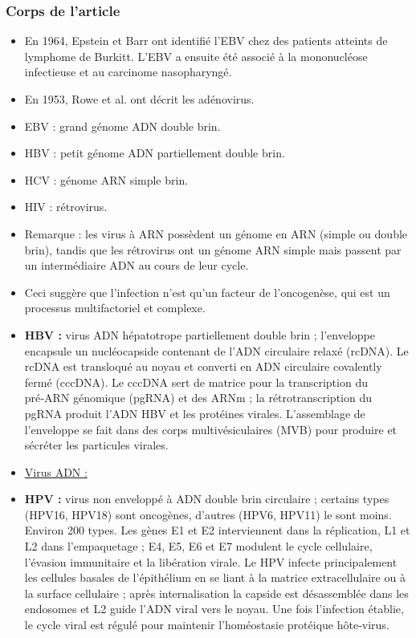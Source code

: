 \documentclass{article}
\begin{document}
\subsubsection{Corps de l'article}
\begin{itemize}
    \item En 1964, Epstein et Barr ont identifié l'EBV chez des patients atteints de lymphome de Burkitt. L'EBV a ensuite été associé à la mononucléose infectieuse et au carcinome nasopharyngé.
    \item En 1953, Rowe et al. ont décrit les adénovirus.
    \item EBV : grand génome ADN double brin.
    \item HBV : petit génome ADN partiellement double brin.
    \item HCV : génome ARN simple brin.
    \item HIV : rétrovirus.
    \item Remarque : les virus à ARN possèdent un génome en ARN (simple ou double brin), tandis que les rétrovirus ont un génome ARN simple mais passent par un intermédiaire ADN au cours de leur cycle.
    \item Ceci suggère que l'infection n'est qu'un facteur de l'oncogenèse, qui est un processus multifactoriel et complexe.
    \item \textbf{HBV :} virus ADN hépatotrope partiellement double brin ; l'enveloppe encapsule un nucléocapside contenant de l'ADN circulaire relaxé (rcDNA). Le rcDNA est transloqué au noyau et converti en ADN circulaire covalently fermé (cccDNA). Le cccDNA sert de matrice pour la transcription du pré‑ARN génomique (pgRNA) et des ARNm ; la rétrotranscription du pgRNA produit l'ADN HBV et les protéines virales. L'assemblage de l'enveloppe se fait dans des corps multivésiculaires (MVB) pour produire et sécréter les particules virales.
    \item \underline{Virus ADN :}
    \item \textbf{HPV :} virus non enveloppé à ADN double brin circulaire ; certains types (HPV16, HPV18) sont oncogènes, d'autres (HPV6, HPV11) le sont moins. Environ 200 types. Les gènes E1 et E2 interviennent dans la réplication, L1 et L2 dans l'empaquetage ; E4, E5, E6 et E7 modulent le cycle cellulaire, l'évasion immunitaire et la libération virale. Le HPV infecte principalement les cellules basales de l'épithélium en se liant à la matrice extracellulaire ou à la surface cellulaire ; après internalisation la capside est désassemblée dans les endosomes et L2 guide l'ADN viral vers le noyau. Une fois l'infection établie, le cycle viral est régulé pour maintenir l'homéostasie protéique hôte‑virus.

\end{itemize}
\end{document}
